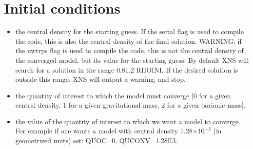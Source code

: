 \documentclass[letterpaper,10pt,english]{sphinxmanual}
\begin{document}
\section{Initial conditions}
\label{\detokenize{user_params:initial-conditions}}\begin{itemize}
\item {} 
\sphinxAtStartPar
{} \sphinxhyphen{} the central density for the starting guess. If the serial flag is used to compile the code, this is also the central density of the final solution. WARNING: if the nwtrps flag is used to compile the code, this is not the central density of the converged model, but its value for the starting guess. By default XNS will search for a solution in the range 0.8\sphinxhyphen{}1.2 RHOINI. If the desired solution is outside this range, XNS will output a warning, and stop.


\item {} 
\sphinxAtStartPar
{} \sphinxhyphen{} the quantity of interest to which the model must converge {[}0 for a given central density, 1 for
a given gravitational mass, 2 for a given barionic mass{]}.


\item {} 
\sphinxAtStartPar
{} \sphinxhyphen{} the value of the quantity of interest to which we want a model to converge. For example if one wants a model with central density 1.28\(\times 10^{-3}\) (in geometrized units) set: QUOC=0, QUCONV=1.28E\sphinxhyphen{}3.

\end{itemize}
\end{document}
